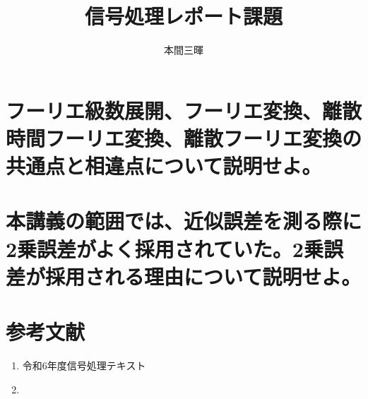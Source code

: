 \documentclass[titlepage,a4paper]{jsarticle}
\title{信号処理レポート課題}
\author{本間三暉}
\begin{document}
\maketitle
\section{フーリエ級数展開、フーリエ変換、離散時間フーリエ変換、離散フーリエ変換の共通点と相違点について説明せよ。}

\section{本講義の範囲では、近似誤差を測る際に2乗誤差がよく採用されていた。2乗誤差が採用される理由について説明せよ。}

\section*{参考文献}
\begin{enumerate}
  \item 令和6年度信号処理テキスト
  \item
\end{enumerate}
\end{document}
